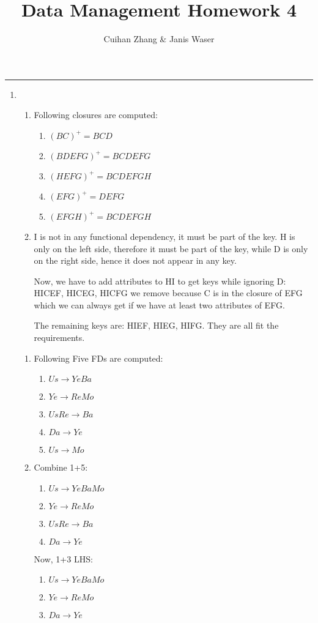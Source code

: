 \documentclass[12pt]{extarticle}
\title{Data Management Homework 4}
\author{Cuihan Zhang \& Janis Waser}
\begin{document}
\maketitle \vspace{-10mm}
\rule{\linewidth}{0.4pt}


\begin{flushleft}
\begin{enumerate}

\item

\begin{enumerate}
\item Following closures are computed:


\begin{enumerate}

\item  $(BC)^+=BCD$
\item $(BDEFG)^+=BCDEFG$
\item $(HEFG)^+=BCDEFGH$
\item $(EFG)^+=DEFG$
\item $(EFGH)^+=BCDEFGH$
\end{enumerate}
\item I is not in any functional dependency, it must be part of the key. H is only on the left side, therefore it must be part of the key, while D is only on the right side, hence it does not appear in any key. 

Now, we have to add attributes to HI to get keys while ignoring D:
HICEF, HICEG, HICFG we remove because C is in the closure of EFG which we can always get if we have at least two attributes of EFG. 

The remaining keys are: HIEF, HIEG, HIFG. They are all fit the requirements.
\end{enumerate}

\begin{enumerate}
\item Following Five FDs are computed:
\begin{enumerate}
\item $Us \rightarrow YeBa$
\item $Ye \rightarrow ReMo$
\item $UsRe \rightarrow Ba$
\item $Da \rightarrow Ye$
\item $Us \rightarrow Mo$
\end{enumerate}
\item 
Combine 1+5:
\begin{enumerate}
\item $Us \rightarrow YeBaMo$
\item $Ye \rightarrow ReMo$
\item $UsRe \rightarrow Ba$
\item $Da \rightarrow Ye$
\end{enumerate}
Now, 1+3 LHS:
\begin{enumerate}
\item $Us \rightarrow YeBaMo$
\item $Ye \rightarrow ReMo$
\item $Da \rightarrow Ye$
\end{enumerate}


\end{enumerate}
\end{enumerate}
\end{flushleft}
\end{document}

